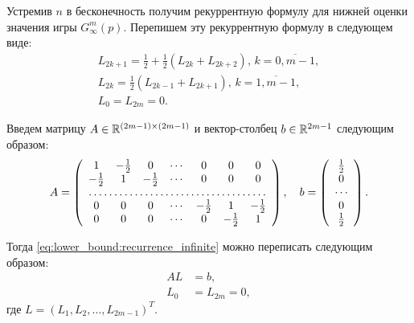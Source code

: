 Устремив $ n $ в бесконечность получим рекуррентную формулу для нижней оценки значения игры $ G_\infty^m(p) $. Перепишем эту рекуррентную формулу в следующем виде:
\begin{equation}
\label{eq:lower_bound:recurrence_infinite}
\begin{gathered}
L_{2k + 1} = \frac{1}{2} + \frac{1}{2} (L_{2k} + L_{2k + 2}), \, 
    k = \overline{0,m-1}, \\
L_{2k} = \frac{1}{2} (L_{2k - 1} + L_{2k + 1}), \, 
    k = \overline{1,m-1}, \\
L_0 = L_{2m} = 0.
\end{gathered}
\end{equation}

Введем матрицу $ A \in \mathbb{R}^{(2m-1)\times(2m-1)} $ и вектор-столбец $ b \in \mathbb{R}^{2m-1} $ следующим образом:
\begin{equation*}
A =
\left(\begin{array}{ccccccc}
    1 & -\frac{1}{2} & 0 & \cdots & 0 & 0 & 0 \\
    -\frac{1}{2} & 1 & -\frac{1}{2} & \cdots & 0 & 0 & 0 \\
    \hdotsfor{7} \\
    0 & 0 & 0 & \cdots & -\frac{1}{2} & 1 & -\frac{1}{2} \\
    0 & 0 & 0 & \cdots & 0 & -\frac{1}{2} & 1 \\
\end{array}\right),\quad
b = \left(\begin{array}{c}
\frac{1}{2} \\
0\\
\cdots\\
0 \\
\frac{1}{2}
\end{array}\right).
\end{equation*}


Тогда \eqref{eq:lower_bound:recurrence_infinite} можно переписать следующим образом:
\[
\begin{aligned}
AL &= b, \\
L_0 &= L_{2m} = 0,
\end{aligned}
\]
где $ L = (L_1, L_2, \ldots, L_{2m-1})^T $.

